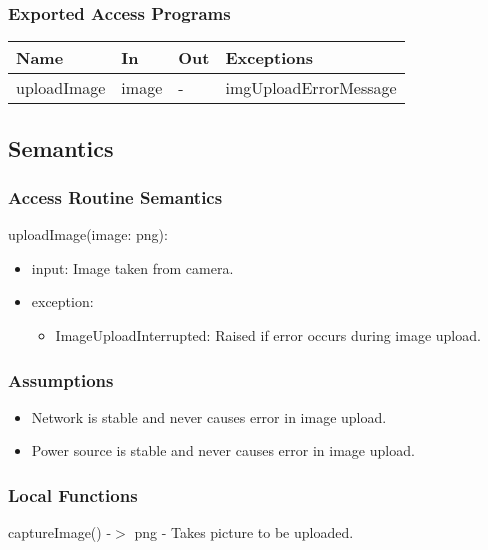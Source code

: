 \documentclass[12pt, titlepage]{article}
\begin{document}
\subsubsection{Exported Access Programs}

\begin{center}
\begin{tabular}{p{3cm} p{2cm} p{2cm} p{5cm}}
\hline
\textbf{Name} & \textbf{In} & \textbf{Out} & \textbf{Exceptions} \\
\hline
uploadImage & image & - & imgUploadErrorMessage \\
\hline
\end{tabular}
\end{center}

\subsection{Semantics}


\subsubsection{Access Routine Semantics}

\noindent uploadImage(image: png):
\begin{itemize}
\item input: Image taken from camera. 
\item exception: 
	\begin{itemize}
		\item ImageUploadInterrupted: Raised if error occurs during image upload.
	\end{itemize} 
\end{itemize}

\subsubsection{Assumptions}
\begin{itemize}
	\item Network is stable and never causes error in image upload.
	\item Power source is stable and never causes error in image upload.
\end{itemize}

\subsubsection{Local Functions}

captureImage() -$>$ png - Takes picture to be uploaded.
\end{document}
